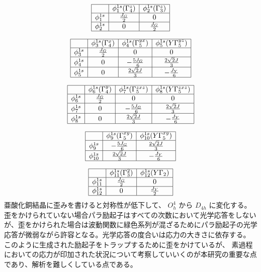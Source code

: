 \[
\begin{array}{|c|c|c|}
\hline
 & \phi_{1}^{1s} ( \Gamma_{4}^{z} ) & \phi_{2}^{1s} ( \Gamma_{3}^{z} ) \\
\hline
\phi_{1}^{1s} & \frac{J_{G}}{2} & 0 \\
\hline
\phi_{2}^{1s} & 0 & \frac{J_{G}}{2} \\
\hline
\end{array}
\]

\[
\begin{array}{|c|c|c|c|}
\hline
 & \phi_{3}^{1s} ( \Gamma_{4}^{x} ) & \phi_{4}^{1s} ( \Gamma_{5}^{y x} ) & \phi_{5}^{1s} ( Y \Gamma_{5}^{y z} ) \\
\hline
\phi_{3}^{1s} & \frac{J_{G}}{2} & 0 & 0 \\
\hline
\phi_{4}^{1s} & 0 & -\frac{5 J_{G}}{6} & \frac{2 \sqrt{2} J}{3} \\
\hline
\phi_{5}^{1s} & 0 & \frac{2 \sqrt{2} J}{3} & -\frac{J_{Y}}{6} \\
\hline
\end{array}
\]

\[
\begin{array}{|c|c|c|c|}
\hline
 & \phi_{6}^{1s} ( \Gamma_{4}^{y} ) & \phi_{7}^{1s} ( \Gamma_{5}^{z x z} ) & \phi_{8}^{1s} ( Y \Gamma_{5}^{z x z} ) \\
\hline
\phi_{6}^{1s} & \frac{J_{G}}{2} & 0 & 0 \\
\hline
\phi_{7}^{1s} & 0 & -\frac{5 J_{G}}{6} & \frac{2 \sqrt{2} J}{3} \\
\hline
\phi_{8}^{1s} & 0 & \frac{2 \sqrt{2} J}{3} & -\frac{J_{Y}}{6} \\
\hline
\end{array}
\]

\[
\begin{array}{|c|c|c|}
\hline
 & \phi_{9}^{1s} ( \Gamma_{5}^{x y} ) & \phi_{10}^{1s} ( Y \Gamma_{5}^{x y} ) \\
\hline
\phi_{9}^{1s} & -\frac{5 J_{G}}{6} & \frac{2 \sqrt{2} J}{3} \\
\hline
\phi_{10}^{1s} & \frac{2 \sqrt{2} J}{3} & -\frac{J_{Y}}{6} \\
\hline
\end{array}
\]

\[
\begin{array}{|c|c|c|}
\hline
 & \phi_{11}^{1s} ( \Gamma_{3}^{2} ) & \phi_{12}^{1s} ( Y \Gamma_{2} ) \\
\hline
\phi_{11}^{1s} & \frac{J_{G}}{2} & 0 \\
\hline
\phi_{12}^{1s} & 0 & \frac{J_{Y}}{2} \\
\hline
\end{array}
\]
亜酸化銅結晶に歪みを書けると対称性が低下して、 $O_h^4$ から $D_{4h}$ に変化する。歪をかけられていない場合パラ励起子はすべての次数において光学応答をしないが、歪をかけられた場合は波動関数に緑色系列が混ざるためにパラ励起子の光学応答が微弱ながら許容となる。光学応答の度合いは応力の大きさに依存する。
このように生成された励起子をトラップするために歪をかけているが、
素過程においての応力が印加された状況について考察していいくのが本研究の重要な点であり、解析を難しくしている点である。
